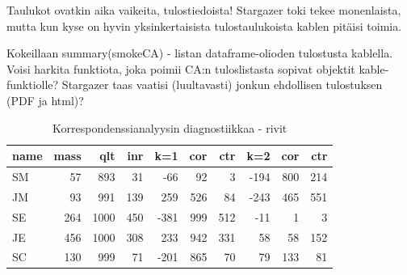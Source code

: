 \documentclass[finnish,]{book}
\newenvironment{Shaded}{\begin{snugshade}}{\end{snugshade}}
\newcommand{\CommentTok}[1]{\textcolor[rgb]{0.56,0.35,0.01}{\textit{#1}}}
\newcommand{\DataTypeTok}[1]{\textcolor[rgb]{0.13,0.29,0.53}{#1}}
\newcommand{\DecValTok}[1]{\textcolor[rgb]{0.00,0.00,0.81}{#1}}
\newcommand{\KeywordTok}[1]{\textcolor[rgb]{0.13,0.29,0.53}{\textbf{#1}}}
\newcommand{\NormalTok}[1]{#1}
\newcommand{\OperatorTok}[1]{\textcolor[rgb]{0.81,0.36,0.00}{\textbf{#1}}}
\newcommand{\OtherTok}[1]{\textcolor[rgb]{0.56,0.35,0.01}{#1}}
\newcommand{\StringTok}[1]{\textcolor[rgb]{0.31,0.60,0.02}{#1}}
\theoremstyle{definition}
\theoremstyle{definition}
\theoremstyle{definition}
\theoremstyle{remark}
\begin{document}
\begin{Shaded}
\end{Shaded}

Taulukot ovatkin aika vaikeita, tulostiedoista! Stargazer toki tekee
monenlaista, mutta kun kyse on hyvin yksinkertaisista tulostaulukoista
kablen pitäisi toimia.

Kokeillaan summary(smokeCA) - listan dataframe-olioden tulostusta
kablella. Voisi harkita funktiota, joka poimii CA:n tuloslistasta
sopivat objektit kable-funktiolle? Stargazer taas vaatisi (luultavasti)
jonkun ehdollisen tulostuksen (PDF ja html)?

\begin{Shaded}
\end{Shaded}

\begin{table}

\caption{\label{tab:simpleCAtab1}Korrespondenssianalyysin diagnostiikkaa - rivit}
\centering
\begin{tabular}[t]{lrrrrrrrrr}
\toprule
name & mass &  qlt &  inr &  k=1 & cor & ctr &  k=2 & cor & ctr\\
\midrule
SM & 57 & 893 & 31 & -66 & 92 & 3 & -194 & 800 & 214\\
JM & 93 & 991 & 139 & 259 & 526 & 84 & -243 & 465 & 551\\
SE & 264 & 1000 & 450 & -381 & 999 & 512 & -11 & 1 & 3\\
JE & 456 & 1000 & 308 & 233 & 942 & 331 & 58 & 58 & 152\\
SC & 130 & 999 & 71 & -201 & 865 & 70 & 79 & 133 & 81\\
\bottomrule
\end{tabular}
\end{table}
\end{document}
